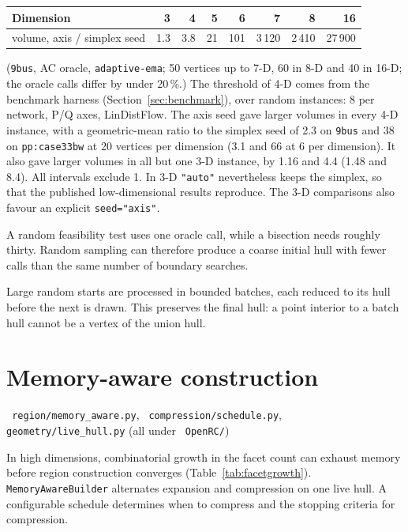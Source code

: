 \documentclass[11pt,a4paper]{report}
\newcommand{\why}[1]{\par\medskip\begingroup\noindent #1\par\endgroup\medskip}
\newcommand{\code}[1]{\texttt{\small #1}}
\newcommand{\file}[1]{\texttt{\small\color{nbgrey} #1}}
\begin{document}
\begin{center}\small
\begin{tabular}{@{}lrrrrrrr@{}}
\toprule
Dimension & 3 & 4 & 5 & 6 & 7 & 8 & 16 \\
\midrule
volume, axis / simplex seed & 1.3 & 3.8 & 21 & 101 & 3\,120 & 2\,410 & 27\,900 \\
\bottomrule
\end{tabular}
\end{center}
\noindent (\code{9bus}, AC oracle, \code{adaptive-ema}; 50 vertices up to 7-D,
60 in 8-D and 40 in 16-D; the oracle calls differ by under 20\,\%.) The
threshold of 4-D comes from the benchmark harness (Section~\ref{sec:benchmark}),
over random instances: 8 per network, P/Q axes, LinDistFlow. The axis seed gave
larger volumes in every 4-D instance, with a geometric-mean ratio to the
simplex seed of
2.3 on \code{9bus} and 38 on \code{pp:case33bw} at 20 vertices per dimension
(3.1 and 66 at 6 per dimension). It also gave larger volumes in all but one
3-D instance, by
1.16 and 4.4 (1.48 and 8.4). All intervals exclude 1. In 3-D \code{"auto"}
nevertheless keeps the simplex, so that the published low-dimensional results
reproduce. The 3-D comparisons also favour an explicit \code{seed="axis"}.

\why{A random feasibility test uses one oracle call, while a bisection needs
roughly thirty. Random sampling can therefore produce a coarse initial hull
with fewer calls than the same number of boundary searches.}

Large random starts are processed in bounded batches, each reduced to its hull
before the next is drawn. This preserves the final hull: a point interior to a
batch hull cannot be a vertex of the union hull.

\section{Memory-aware construction}
\label{sec:memaware}

\file{region/memory\_aware.py}, \file{compression/schedule.py},
\file{geometry/live\_hull.py} (all under \file{OpenRC/})

In high dimensions, combinatorial growth in the facet count can exhaust
memory before region construction converges (Table~\ref{tab:facetgrowth}).
\code{MemoryAwareBuilder} alternates expansion and compression on one live
hull. A configurable schedule determines when to compress and the stopping
criteria for compression.
\end{document}
